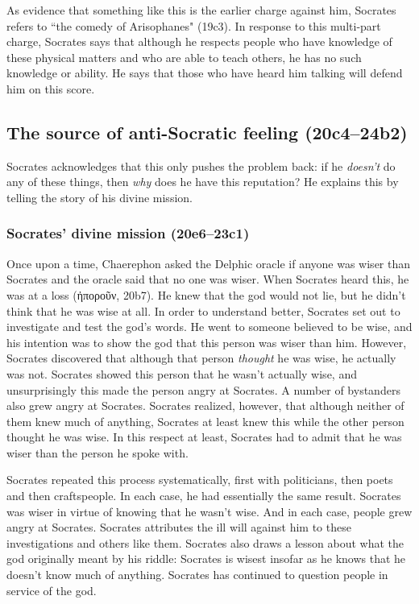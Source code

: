 \documentclass[11pt]{article}
\begin{document}
As evidence that something like this is the earlier charge against him,
Socrates refers to ``the comedy of Arisophanes" (19c3).  In response to
this multi-part charge, Socrates says that although he respects people who
have knowledge of these physical matters and who are able to teach others,
he has no such knowledge or ability.  He says that those who have heard him
talking will defend him on this score.

\subsection{The source of anti-Socratic feeling (20c4--24b2)}

Socrates acknowledges that this only pushes the problem back: if he
\emph{doesn't} do any of these things, then \emph{why} does he have this
reputation?  He explains this by telling the story of his divine mission.

\subsubsection{Socrates' divine mission (20e6--23c1)}

Once upon a time, Chaerephon asked the Delphic oracle if anyone was wiser
than Socrates and the oracle said that no one was wiser.  When Socrates
heard this, he was at a loss (ἠποροῦν, 20b7).  He knew that the god would
not lie, but he didn't think that he was wise at all.  In order to
understand better, Socrates set out to investigate and test the god's
words.  He went to someone believed to be wise, and his intention was to
show the god that this person was wiser than him.  However, Socrates
discovered that although that person \emph{thought} he was wise, he
actually was not.  Socrates showed this person that he wasn't actually
wise, and unsurprisingly this made the person angry at Socrates.  A number
of bystanders also grew angry at Socrates.  Socrates realized, however,
that although neither of them knew much of anything, Socrates at least knew
this while the other person thought he was wise. In this respect at least,
Socrates had to admit that he was wiser than the person he spoke with.

Socrates repeated this process systematically, first with politicians, then
poets and then craftspeople.  In each case, he had essentially the same
result.  Socrates was wiser in virtue of knowing that he wasn't wise.  And
in each case, people grew angry at Socrates.  Socrates attributes the ill
will against him to these investigations and others like them.  Socrates
also draws a lesson about what the god originally meant by his riddle:
Socrates is wisest insofar as he knows that he doesn't know much of
anything.  Socrates has continued to question people in service of the god.
\end{document}
